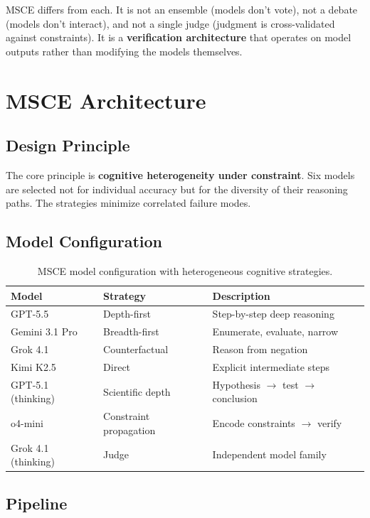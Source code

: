 \documentclass[11pt,a4paper]{article}
\begin{document}
MSCE differs from each. It is not an ensemble (models don't vote), not a debate (models don't interact), and not a single judge (judgment is cross-validated against constraints). It is a \textbf{verification architecture} that operates on model outputs rather than modifying the models themselves.

\section{MSCE Architecture}

\subsection{Design Principle}

The core principle is \textbf{cognitive heterogeneity under constraint}. Six models are selected not for individual accuracy but for the diversity of their reasoning paths. The strategies minimize correlated failure modes.

\subsection{Model Configuration}

\begin{table}[ht]
\centering
\begin{tabular}{lll}
\toprule
\textbf{Model} & \textbf{Strategy} & \textbf{Description} \\
\midrule
GPT-5.5 & Depth-first & Step-by-step deep reasoning \\
Gemini 3.1 Pro & Breadth-first & Enumerate, evaluate, narrow \\
Grok 4.1 & Counterfactual & Reason from negation \\
Kimi K2.5 & Direct & Explicit intermediate steps \\
GPT-5.1 (thinking) & Scientific depth & Hypothesis $\to$ test $\to$ conclusion \\
o4-mini & Constraint propagation & Encode constraints $\to$ verify \\
\midrule
Grok 4.1 (thinking) & Judge & Independent model family \\
\bottomrule
\end{tabular}
\caption{MSCE model configuration with heterogeneous cognitive strategies.}
\end{table}

\subsection{Pipeline}
\end{document}
